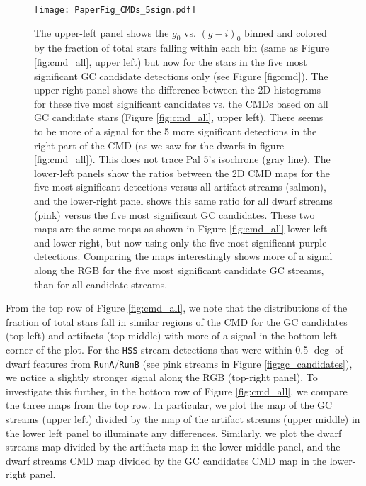 \documentclass[twocolumn]{aastex631}
\begin{document}
\begin{figure}
\centerline{\texttt{[image: PaperFig\_CMDs\_5sign.pdf]}}
\caption{The upper-left panel shows the $g_0$ vs. $(g-i)_0$ binned and colored by the fraction of total stars falling within each bin  (same as Figure \ref{fig:cmd_all}, upper left) but now for the stars in the five most significant GC candidate detections only (see Figure \ref{fig:cmd}). The upper-right panel shows the difference between the 2D histograms for these five most significant candidates vs. the CMDs based on all GC candidate stars (Figure \ref{fig:cmd_all}, upper left). There seems to be more of a signal for the 5 more significant detections in the right part of the CMD (as we saw for the dwarfs in figure \ref{fig:cmd_all}). This does not trace Pal 5's isochrone (gray line). The lower-left  panels show the ratios between the 2D CMD maps for the five most significant detections versus all artifact streams (salmon), and the lower-right panel shows this same ratio for all dwarf streams (pink) versus the five most significant GC candidates. These two maps are the same maps as shown in Figure \ref{fig:cmd_all} lower-left and lower-right, but now using only the five most significant purple detections. Comparing the maps interestingly shows more of a signal along the RGB for the five most significant candidate GC streams, than for all candidate streams.
}
\label{fig:cmd_5sign}
\end{figure}


From the top row of Figure \ref{fig:cmd_all}, we note that the distributions of the fraction of total stars fall in similar regions of the CMD for the GC candidates (top left) and artifacts (top middle) with more of a signal in the bottom-left corner of the plot. For the \texttt{HSS} stream detections that were within 0.5 $\deg$ of dwarf features from \texttt{RunA}/\texttt{RunB} (see pink streams in Figure \ref{fig:gc_candidates}), we notice a slightly stronger signal along the RGB (top-right panel). To investigate this further, in the bottom row of Figure \ref{fig:cmd_all}, we compare the three maps from the top row. In particular, we plot the map of the GC streams (upper left) divided by the map of the artifact streams (upper middle) in the lower left panel to illuminate any differences. Similarly, we plot the dwarf streams map divided by the artifacts map in the lower-middle panel, and the dwarf streams CMD map divided by the GC candidates CMD map in the lower-right panel. 
\end{document}
